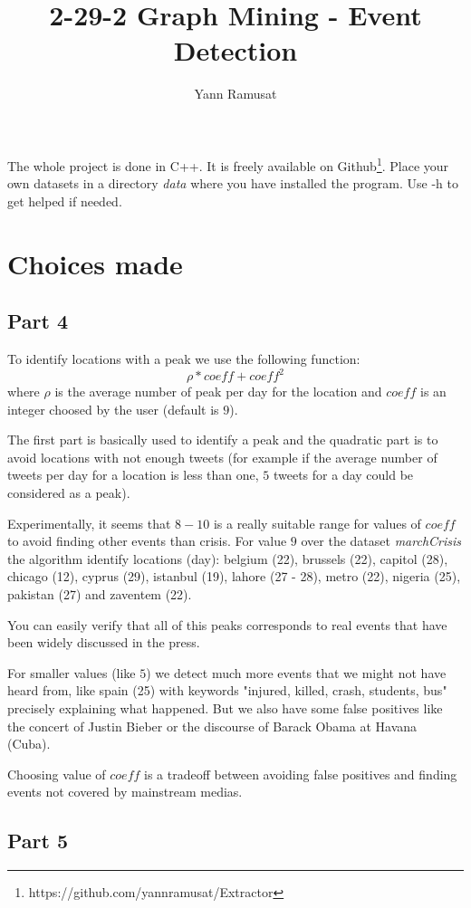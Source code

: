 \documentclass[a4paper]{article}
\title{2-29-2 Graph Mining - Event Detection}
\author{Yann Ramusat}
\begin{document}
\maketitle
The whole project is done in C++. It is freely available on Github\footnote{https://github.com/yannramusat/Extractor}. Place your own datasets in a directory \textit{data} where you have installed the program. Use -h to get helped if needed. 

\section{Choices made}
\subsection{Part 4}
 To identify locations with a peak we use the following function:
\[
   \rho*coeff + coeff^2
\]
 where $\rho$ is the average number of peak per day for the location and $coeff$ is an integer choosed by the user (default is $9$). 
 
 The first part is basically used to identify a peak and the quadratic part is to avoid locations with not enough tweets (for example if the average number of tweets per day for a location is less than one, $5$ tweets for a day could be considered as a peak).
 
 Experimentally, it seems that $8-10$ is a really suitable range for values of $coeff$ to avoid finding other events than crisis. For value $9$ over the dataset \textit{marchCrisis} the algorithm identify locations (day): belgium (22), brussels (22), capitol (28), chicago (12), cyprus (29), istanbul (19), lahore (27 - 28), metro (22), nigeria (25), pakistan (27) and zaventem (22).
 
 You can easily verify that all of this peaks corresponds to real events that have been widely discussed in the press.
 
 For smaller values (like $5$) we detect much more events that we might not have heard from, like spain (25) with keywords "injured, killed, crash, students, bus" precisely explaining what happened. But we also have some false positives like the concert of Justin Bieber or the discourse of Barack Obama at Havana (Cuba).
 
 Choosing value of $coeff$ is a tradeoff between avoiding false positives and finding events not covered by mainstream medias.
 
\subsection{Part 5}
\end{document}
